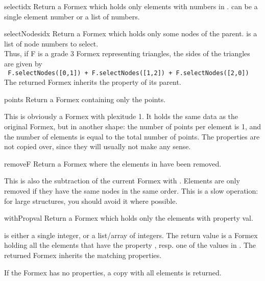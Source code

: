 \begin{methoddesc}{select}{idx}
Return a Formex which holds only elements with numbers in .
 can be a single element number or a list of numbers.
\end{methoddesc}

\begin{methoddesc}{selectNodes}{idx}
Return a Formex which holds only some nodes of the parent.  is a list of node numbers to select.\\
Thus, if F is a grade 3 Formex representing triangles, the sides of the triangles are given by\\
\verb? F.selectNodes([0,1]) + F.selectNodes([1,2]) + F.selectNodes([2,0]) ?\\
The returned Formex inherits the property of its parent.
\end{methoddesc}

\begin{methoddesc}{points}{}
Return a Formex containing only the points.

This is obviously a Formex with plexitude 1. It holds the same data as the original Formex, but in another shape: the number of points per element is 1, and the number of elements is equal to the total number of points. The properties are not copied over, since they will usually not make any sense.
\end{methoddesc}

\begin{methoddesc}{remove}{F}
Return a Formex where the elements in  have been removed.

This is also the subtraction of the current Formex with . Elements are only removed if they have the same nodes in the same order. This is a slow operation: for large structures, you should avoid it where possible.
\end{methoddesc}

\begin{methoddesc}{withProp}{val}
Return a Formex which holds only the elements with property val.

 is either a single integer, or a list/array of integers.
The return value is a Formex holding all the elements that
have the property , resp. one of the values in .
The returned Formex inherits the matching properties.
        
If the Formex has no properties, a copy with all elements is returned.
\end{methoddesc}

